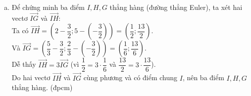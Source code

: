 \begin{vd}
{\begin{enumerate}[a)]
            \item Để chứng minh ba điểm $I, H, G$ thẳng hàng (đường thẳng Euler), ta xét hai vectơ $\overrightarrow{IG}$ và $\overrightarrow{IH}$:\\
                  Ta có $\overrightarrow{IH} = \left(2 - \dfrac{3}{2}; 5 - \left(-\dfrac{3}{2}\right)\right) = \left(\dfrac{1}{2}; \dfrac{13}{2}\right)$.\\
                  Và $\overrightarrow{IG} = \left(\dfrac{5}{3} - \dfrac{3}{2}; \dfrac{2}{3} - \left(-\dfrac{3}{2}\right)\right) = \left(\dfrac{1}{6}; \dfrac{13}{6}\right)$.\\
                  Dễ thấy $\overrightarrow{IH} = 3\overrightarrow{IG}$ (vì $\dfrac{1}{2} = 3 \cdot \dfrac{1}{6}$ và $\dfrac{13}{2} = 3 \cdot \dfrac{13}{6}$).\\
                  Do hai vectơ $\overrightarrow{IH}$ và $\overrightarrow{IG}$ cùng phương và có điểm chung $I$, nên ba điểm $I, H, G$ thẳng hàng. (đpcm)
        \end{enumerate}
    }
\end{vd}

